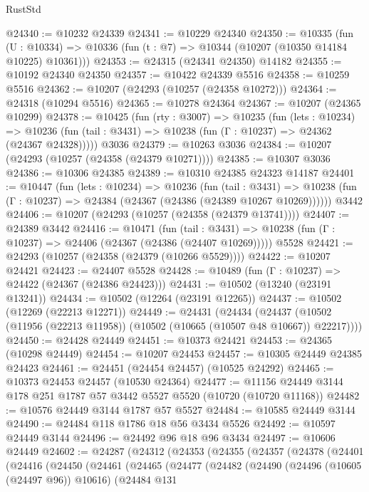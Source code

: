 \begin{lexlean}{RustStd}
\begin{coremodule}
@24340 := @10232 @24339
@24341 := @10229 @24340
@24350 := @10335
    (fun (U : @10334) => @10336 (fun (t : @7) => @10344 (@10207 (@10350 @14184 @10225) @10361)))
@24353 := @24315 (@24341 @24350) @14182
@24355 := @10192 @24340 @24350
@24357 := @10422 @24339 @5516
@24358 := @10259 @5516
@24362 := @10207 (@24293 (@10257 (@24358 @10272)))
@24364 := @24318 (@10294 @5516)
@24365 := @10278 @24364
@24367 := @10207 (@24365 @10299)
@24378 := @10425
    (fun (rty : @3007) =>
    @10235
      (fun (lets : @10234) =>
      @10236 (fun (tail : @3431) => @10238 (fun (Γ : @10237) => @24362 (@24367 @24328)))))
    @3036
@24379 := @10263 @3036
@24384 := @10207 (@24293 (@10257 (@24358 (@24379 @10271))))
@24385 := @10307 @3036
@24386 := @10306 @24385
@24389 := @10310 @24385 @24323 @14187
@24401 := @10447
    (fun (lets : @10234) =>
    @10236
      (fun (tail : @3431) =>
      @10238 (fun (Γ : @10237) => @24384 (@24367 (@24386 (@24389 @10267 @10269))))))
    @3442
@24406 := @10207 (@24293 (@10257 (@24358 (@24379 @13741))))
@24407 := @24389 @3442
@24416 := @10471
    (fun (tail : @3431) => @10238 (fun (Γ : @10237) => @24406 (@24367 (@24386 (@24407 @10269)))))
    @5528
@24421 := @24293 (@10257 (@24358 (@24379 (@10266 @5529))))
@24422 := @10207 @24421
@24423 := @24407 @5528
@24428 := @10489 (fun (Γ : @10237) => @24422 (@24367 (@24386 @24423)))
@24431 := @10502 (@13240 (@23191 @13241))
@24434 := @10502 (@12264 (@23191 @12265))
@24437 := @10502 (@12269 (@22213 @12271))
@24449 := @24431
    (@24434 (@24437 (@10502 (@11956 (@22213 @11958)) (@10502 (@10665 (@10507 @48 @10667)) @22217))))
@24450 := @24428 @24449
@24451 := @10373 @24421
@24453 := @24365 (@10298 @24449)
@24454 := @10207 @24453
@24457 := @10305 @24449 @24385 @24423
@24461 := @24451 (@24454 @24457) (@10525 @24292)
@24465 := @10373 @24453 @24457 (@10530 @24364)
@24477 := @11156 @24449 @3144 @178 @251 @1787 @57 @3442 @5527 @5520 (@10720 (@10720 @11168))
@24482 := @10576 @24449 @3144 @1787 @57 @5527
@24484 := @10585 @24449 @3144
@24490 := @24484 @118 @1786 @18 @56 @3434 @5526
@24492 := @10597 @24449 @3144
@24496 := @24492 @96 @18 @96 @3434
@24497 := @10606 @24449
@24602 := @24287
    (@24312
      (@24353
        (@24355
          (@24357
            (@24378
              (@24401
                (@24416
                  (@24450
                    (@24461
                      (@24465
                        (@24477
                          (@24482
                            (@24490
                              (@24496 (@10605 (@24497 @96)) @10616)
                              (@24484
                                @131

\end{coremodule}
\end{lexlean}
